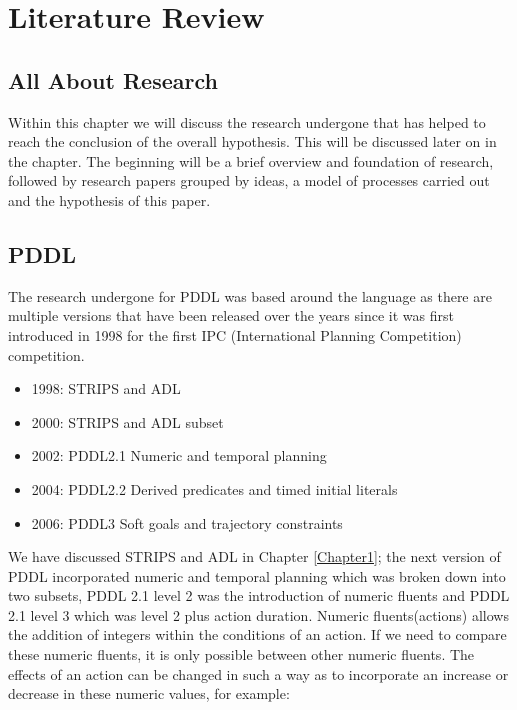 \chapter{Literature Review} %

\label{Chapter2} %

\section{All About Research}
Within this chapter we will discuss the research undergone that has helped to reach the conclusion of the overall hypothesis. This will be discussed later on in the chapter. The beginning will be a brief overview and foundation of research, followed by research papers grouped by ideas, a model of processes carried out and the hypothesis of this paper. 
\section{PDDL}
The research undergone for PDDL was based around the language as there are multiple versions that have been released over the years since it was first introduced in 1998 for the first IPC (International Planning Competition) competition\cite{1998IPC}.
\begin{itemize}
\item 1998: STRIPS and ADL
\item 2000: STRIPS and ADL subset
\item 2002: PDDL2.1 Numeric and temporal planning
\item 2004: PDDL2.2 Derived predicates and timed initial literals
\item 2006: PDDL3 Soft goals and trajectory constraints 
\end{itemize}

We have discussed STRIPS and ADL in Chapter \ref{Chapter1}; the next version of PDDL incorporated numeric and temporal planning which was broken down into two subsets, PDDL 2.1 level 2 was the introduction of numeric fluents and PDDL 2.1 level 3 which was level 2 plus action duration. 
Numeric fluents(actions) allows the addition of integers within the conditions of an action\cite{PDDL2.1}. If we need to compare these numeric fluents, it is only possible between other numeric fluents. The effects of an action can be changed in such a way as to incorporate an increase or decrease in these numeric values, for example: 

